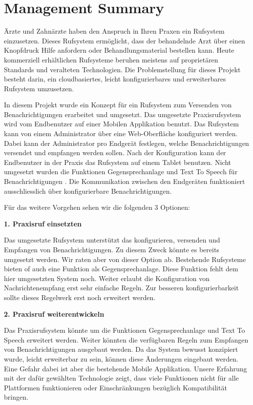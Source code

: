 \section*{Management Summary}

Ärzte und Zahnärzte haben den Anspruch in Ihren Praxen ein Rufsystem einzusetzen.
Dieses Rufsystem ermöglicht, dass der behandelnde Arzt über einen Knopfdruck Hilfe anfordern oder Behandlungsmaterial bestellen kann.
Heute kommerziell erhältlichen Rufsysteme beruhen meistens auf proprietären Standards und veralteten Technologien. \cite{aufgabenstellung}
Die Problemstellung für dieses Projekt besteht darin, ein cloudbasiertes, leicht konfigurierbares und erweiterbares Rufsystem umzusetzen.

In diesem Projekt wurde ein Konzept für ein Rufsystem zum Versenden von Benachrichtigungen erarbeitet und umgesetzt.
Das umgesetzte Praxisrufsystem wird vom Endbenutzer auf einer Mobilen Applikation benutzt.
Das Rufsystem kann von einem Administrator über eine Web-Oberfläche konfiguriert werden.
Dabei kann der Administrator pro Endgerät festlegen, welche Benachrichtigungen versendet und empfangen werden sollen.
Nach der Konfiguration kann der Endbenutzer in der Praxis das Rufsystem auf einem Tablet benutzen.
Nicht umgesetzt wurden die Funktionen Gegensprechanlage und Text To Speech für Benachrichtigungen .
Die Kommunikation zwischen den Endgeräten funktioniert ausschliesslich über konfigurierbare Benachrichtigungen.

Für das weitere Vorgehen sehen wir die folgenden 3 Optionen:


\textbf{1. Praxisruf einsetzten}

Das umgesetzte Rufsystem unterstützt das konfigurieren, versenden und Empfangen von Benachrichtigungen.
Zu diesem Zweck könnte es bereits umgesetzt werden.
Wir raten aber von dieser Option ab.
Bestehende Rufsysteme bieten of auch eine Funktion als Gegensprechanlage.
Diese Funktion fehlt dem hier umgesetzten System noch.
Weiter erlaubt die Konfiguration von Nachrichtenempfang erst sehr einfache Regeln.
Zur besseren konfigurierbarkeit sollte dieses Regelwerk erst noch erweitert werden.

\textbf{2. Praxisruf weiterentwickeln}

Das Praxisrufsystem könnte um die Funktionen Gegensprechanlage und Text To Speech erweitert werden.
Weiter könnten die verfügbaren Regeln zum Empfangen von Benachrichtigungen ausgebaut werden.
Da das System bewusst konzipiert wurde, leicht erweiterbar zu sein, können diese Änderungen eingebaut werden.
Eine Gefahr dabei ist aber die bestehende Mobile Applikation.
Unsere Erfahrung mit der dafür gewählten Technologie zeigt, dass viele Funktionen nicht für alle Plattformen funktionieren
oder Einschränkungen bezüglich Kompatibilität bringen.

